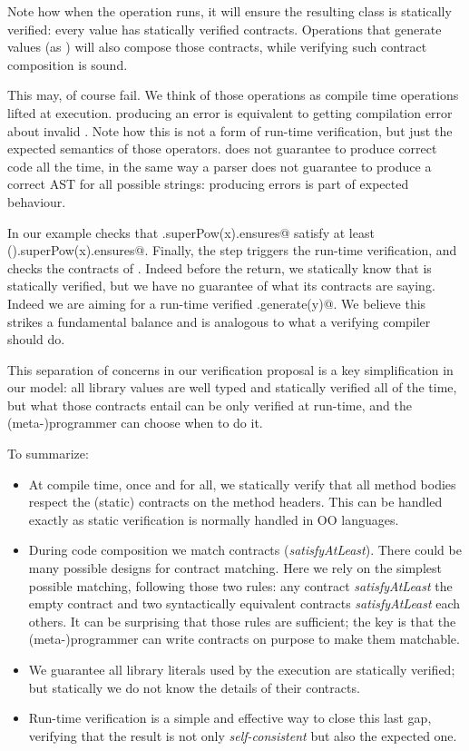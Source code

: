 Note how when the \Q@Override@ operation  runs, it will
ensure the resulting class is statically verified:
every \Q@Library@ value has statically verified contracts. Operations 
that generate \Q@Library@ values (as \Q@Override@) will also compose those contracts, while verifying such
contract composition is sound.

This may, of course fail.
We think of those operations as compile time operations lifted at execution.
\Q@Override@ producing an error is  equivalent to
getting compilation error about invalid \Q@extends@.
Note how this is not a form of run-time verification, but just the expected semantics of those operators.
\Q@Override@ does not guarantee to produce correct code all the time, in the same way a parser does not guarantee to produce a correct AST for all possible strings: producing errors is part of \Q@Override@ expected behaviour.

In our example \Q@Override@ checks that \Q@res.superPow(x).ensures@
 satisfy at least \Q@inductive().superPow(x).ensures@.
Finally, the \Q@return@ step triggers the run-time verification, and
checks the contracts of \Q@res@.
Indeed before the return, we statically know that \Q@res@ is statically verified,
 but we have no guarantee of what its contracts are saying.
Indeed we are aiming for a run-time verified \Q@Pow.generate(y)@.
We believe this strikes a fundamental balance and is analogous to what a
verifying compiler~\cite{hoare2003verifying} should do.

This separation of concerns in our verification proposal is a key simplification
in our model:
all library values are well typed and statically verified all of the time,
but what those contracts entail can be only verified at run-time, and
the (meta-)programmer can choose when to do it.




To summarize:
\begin{itemize}
\item
At compile time, once and for all, we statically verify that all
method bodies respect the (static) contracts on the method headers.
This can be handled exactly as static verification is normally handled in OO languages.
\item
During code composition we match contracts (\emph{satisfyAtLeast}).
There could be many possible designs for contract matching.
Here we rely on the simplest possible matching, following those two rules:
any contract \emph{satisfyAtLeast} the empty contract
and two syntactically equivalent contracts \emph{satisfyAtLeast} each others.
It can be surprising that those rules are sufficient;
the key is that 
the (meta-)programmer can write contracts
on purpose to make them matchable.
\item
We guarantee all library literals used by the execution are statically verified; but
statically we do not know the details of their contracts.
\item
Run-time verification is a simple and effective way to close this last gap, verifying
that the result is not only \emph{self-consistent} but also the expected one.
\end{itemize}


